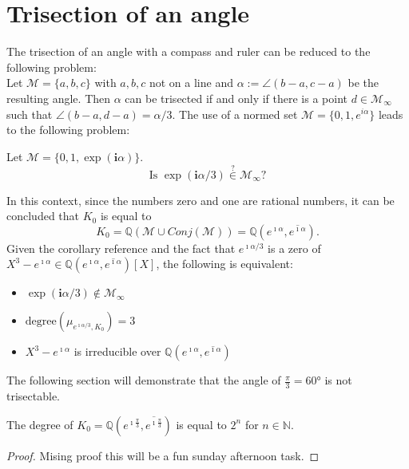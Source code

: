 \section{Trisection of an angle}
The trisection of an angle with a compass and ruler can be reduced to the following problem:\\
Let $\mathcal{M} = \{a, b, c\}$ with $a, b, c$ not on a line and $\alpha := \angle (b - a, c - a)$ be the resulting angle.
Then $\alpha$ can be trisected if and only if there is a point $d\in \mathcal{M}_{\infty}$ such that $\angle (b - a, d - a) = \alpha/3$. 
The use of a normed set $\mathcal{M} = \{0,1,e^{i\alpha}\}$ leads to the following problem:
\begin{problem}
    Let $\mathcal{M} = \{0,1,\exp(\textbf{i} \alpha)\}$. $$\text{Is }\exp(\textbf{i} \alpha/3) \overset{?}{\in} \mathcal{M}_{\infty}?$$
\end{problem}
In this context, since the numbers zero and one are rational numbers, it can be concluded that $K_0$ is equal to
$$ K_0 = \mathbb{Q}(\mathcal{M}\cup Conj(\mathcal{M})) = \mathbb{Q}(e^{\imath\alpha},\overline{e^{\imath\alpha}}). $$
Given the corollary reference and the fact that $e^{\imath\alpha/3}$ is a zero of $X^3 - e^{\imath\alpha}\in \mathbb{Q}(e^{\imath\alpha},\overline{e^{\imath\alpha}})[X]$, the following is  equivalent: 
\begin{itemize}
    \item $\exp(\textbf{i} \alpha/3) \notin \mathcal{M}_{\infty}$
    \item $\text{degree}(\mu_{e^{\imath\alpha/3},K_0}) = 3$
    \item $X^3 - e^{\imath\alpha}$ is irreducible over $\mathbb{Q}(e^{\imath\alpha},\overline{e^{\imath\alpha}})$
\end{itemize}
The following section will demonstrate that the angle of $\frac{\pi}{3}=60°$  is not trisectable.

\begin{lemma}
    \label{lem:degree_K0_angel}

    The degree of $K_0 = \mathbb{Q}(e^{\imath\frac{\pi}{3}},\overline{e^{\imath\frac{\pi}{3}}})$ is equal  to $2^n$ for $n\in \mathbb{N}$. 
\end{lemma}
\begin{proof}
    Mising proof this will be a fun sunday afternoon task.
\end{proof}

